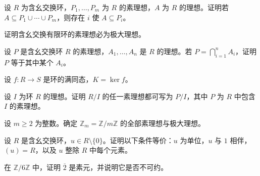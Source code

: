 \noindent\begin{minipage}{\textwidth}
设 $R$ 为含幺交换环，$P_1,\dots,P_m$ 为 $R$ 的素理想，$A$ 为 $R$ 的理想。证明若 $A\subseteq P_1\cup\cdots\cup P_m$，则存在 $i$ 使 $A\subseteq P_i$。
\end{minipage}\par\vfill
\newpage
\noindent\begin{minipage}{\textwidth}
证明含幺交换有限环的素理想必为极大理想。
\end{minipage}\par\vfill
\noindent\begin{minipage}{\textwidth}
设 $P$ 是含幺交换环 $R$ 的素理想，$A_1,\dots,A_n$ 是 $R$ 的理想。若 $P=\bigcap_{i=1}^n A_i$，证明 $P$ 等于其中某个 $A_i$。
\end{minipage}\par\vfill
\noindent\begin{minipage}{\textwidth}
设 $f\colon R\to S$ 是环的满同态，$K=\ker f$。
\end{minipage}\par\vfill
\newpage
\noindent\begin{minipage}{\textwidth}
设 $I$ 为环 $R$ 的理想。证明 $R/I$ 的任一素理想都可写为 $P/I$，其中 $P$ 为 $R$ 中包含 $I$ 的素理想。
\end{minipage}\par\vfill
\noindent\begin{minipage}{\textwidth}
设 $m\ge 2$ 为整数。确定 $\mathbb{Z}_m=\mathbb{Z}/m\mathbb{Z}$ 的全部素理想与极大理想。
\end{minipage}\par\vfill
\noindent\begin{minipage}{\textwidth}
设 $R$ 是含幺交换环，$u\in R\setminus\{0\}$。证明以下条件等价：$u$ 为单位，$u$ 与 $1$ 相伴，$(u)=R$，以及 $u$ 整除 $R$ 中每个元素。
\end{minipage}\par\vfill
\newpage
\noindent\begin{minipage}{\textwidth}
在 $\mathbb{Z}/6\mathbb{Z}$ 中，证明 $\overline{2}$ 是素元，并说明它是否不可约。
\end{minipage}\par\vfill
